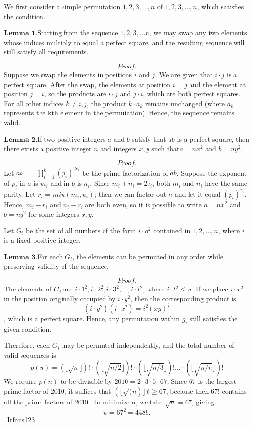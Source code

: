 \begin{enumerate}
 We first consider a simple permutation ${1,2,3,...,n}$ of ${1,2,3,...,n}$, which satisfies the condition.

 $\textbf{Lemma 1.}$Starting from the sequence ${1,2,3,...n}$, we may swap any two elements whose indices multiply to equal a perfect square, and the resulting sequence will still satisfy all requirements.

 
 \[\textit{Proof.}\]Suppose we swap the elements in positions $i$ and $j$. We are given that $i \cdot j$ is a perfect square. After the swap, the elements at position $i = j$ and the element at position $j = i$, so the products are $i \cdot j$ and $j \cdot i$, which are both perfect squares. For all other indices $k \neq i,j$, the product $k \cdot a_k$ remains unchanged (where $a_k$ represents the kth element in the permutation). Hence, the sequence remains valid.

 $\textbf{Lemma 2.}$If two positive integers $a$ and $b$ satisfy that $ab$ is a perfect square, then there exists a positive integer $n$ and integers $x,y$ such that$a = nx^2$ and $b = ny^2$.

 
 \[\textit{Proof.}\]Let $ab$ $=$ $\prod_{i=1}^{k} (p_i)^{2e_i}$ be the prime factorization of $ab$. Suppose the exponent of $p_i$ in $a$ is $m_i$ and in $b$ is $n_i$. Since $m_i + n_i = 2e_i$, both $m_i$ and $n_i$ have the same parity. Let $r_i$ = $min(m_i,n_i)$; then we can factor out $n$ and let it equal $(p_i)^{r_i}$. Hence, $m_i - r_i$ and $n_i - r_i$ are both even, so it is possible to write $a=nx^2$ and $b=ny^2$ for some integers $x,y$.

 Let $G_i$ be the set of all numbers of the form $i \cdot a^2$ contained in ${1,2,...,n}$, where $i$ is a fixed positive integer.

 $\textbf{Lemma 3.}$For each $G_i$, the elements can be permuted in any order while preserving validity of the sequence.

 
 \[\textit{Proof.}\]The elements of $G_i$ are $i \cdot 1^2, i \cdot 2^2, i \cdot 3^2,..., i \cdot t^2$, where $i \cdot t^2 \leq n$. If we place $i \cdot x^2$ in the position originally occupied by $i \cdot y^2$, then the corresponding product is 
 \[(i \cdot y^2)(i \cdot x^2) = i^2(xy)^2\], which is a perfect square. Hence, any permutation within $g_i$ still satisfies the given condition.

 Therefore, each $G_i$ may be permuted independently, and the total number of valid sequences is 
 \[p(n) = (\lfloor \sqrt{n} \rfloor)! \cdot (\lfloor \sqrt{n/2} \rfloor)! \cdot (\lfloor \sqrt{n/3} \rfloor)!... \cdot (\lfloor \sqrt{n/n} \rfloor)!\]We require $p(n)$ to be divisible by $2010 = 2 \cdot 3 \cdot 5 \cdot 67$. Since $67$ is the largest prime factor of $2010$, it suffices that $(\lfloor \sqrt(n) \rfloor)! \geq 67$, because then $67!$ contains all the prime factors of $2010$. To minimize n, we take $\sqrt{n} = 67$, giving 
 \[n = 67^2 = \boxed{4489}.\]~Irfans123


\end{enumerate}
